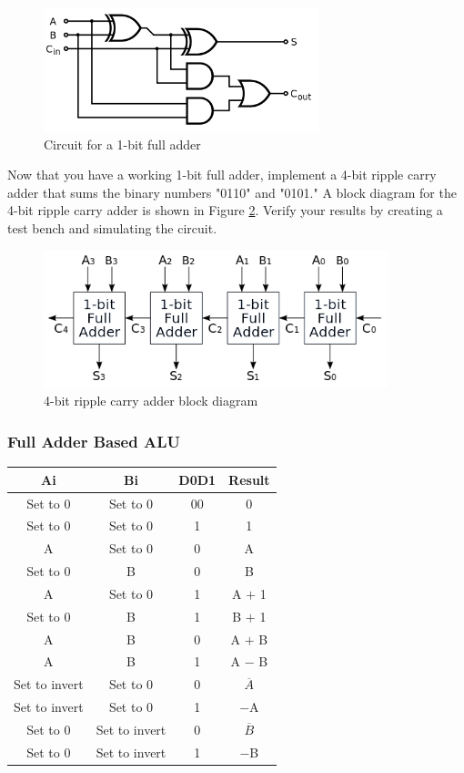 \begin{figure}[H]
	\centering
	\includegraphics[width=80mm]{Lab3/figures/fulladder.png}
	\caption{Circuit for a 1-bit full adder}
	\label{fig:fulladder}
\end{figure}

Now that you have a working 1-bit full adder, implement a 4-bit ripple carry adder that sums the binary numbers "0110" and "0101." A block diagram for the 4-bit ripple carry adder is shown in Figure \ref{fig:fourbitripple}. Verify your results by creating a test bench and simulating the circuit.

\begin{figure}[H]
	\centering
	\includegraphics[width=100mm]{Lab3/figures/fourbitripple.png}
	\caption{4-bit ripple carry adder block diagram}
	\label{fig:fourbitripple}
\end{figure}

\subsubsection{Full Adder Based ALU}


\begin{tabular}{ | c | c | c | c | }
 	\hline                        
 	 Ai & Bi & D0D1 & Result \\ \hline
 	 Set to 0 & Set to 0 & 00 & 0 \\ \hline
 	 Set to 0 &  Set to 0  & 1 & 1 \\ \hline
 	 A &  Set to 0 & 0 & A \\ \hline
 	 Set to 0& B  & 0  & B  \\ \hline
 	 A & Set to 0 & 1 & A $+$ 1 \\ \hline
 	 Set to 0 & B & 1 & B $+$ 1 \\ \hline
 	 A & B & 0 & A $+$ B \\ \hline
 	 A & B & 1 & A $-$ B \\ \hline
 	 Set to invert & Set to 0 & 0 & $\overline{A}$ \\ \hline
 	 Set to invert & Set to 0 & 1 & $-$A \\ \hline
 	 Set to 0 & Set to invert & 0 &  $\overline{B}$ \\ \hline
 	 Set to 0 & Set to invert & 1 & $-$B \\
 	 \hline
\end{tabular}

